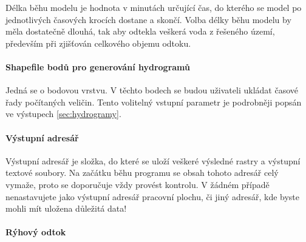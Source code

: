 Délka běhu modelu je hodnota v minutách určující čas, do kterého se model po jednotlivých časových krocích dostane a skončí. Volba délky běhu modelu by měla dostatečně dlouhá, tak aby odtekla veškerá voda z řešeného území, především při zjišťován celkového objemu odtoku.
 




\paragraph{Shapefile bodů pro generování hydrogramů} \label{sec:vstupbody}

Jedná  se o bodovou vrstvu. V těchto bodech se budou uživateli ukládat časové řady počítaných veličin. Tento volitelný vstupní parametr je podrobněji popsán ve výstupech \ref{sec:hydrogramy}.

\paragraph{Výstupní adresář} \label{sec:vstupadresar}
Výstupní adresář je složka, do které se uloží veškeré výsledné rastry a výstupní textové soubory. Na začátku běhu programu se obsah tohoto adresář celý vymaže, proto se doporučuje vždy provést kontrolu. V žádném případě nenastavujete jako výstupní adresář pracovní plochu, či jiný adresář, kde byste mohli mít uložena důležitá data!

\paragraph{Rýhový odtok} \label{sec:vstupryhovy}

